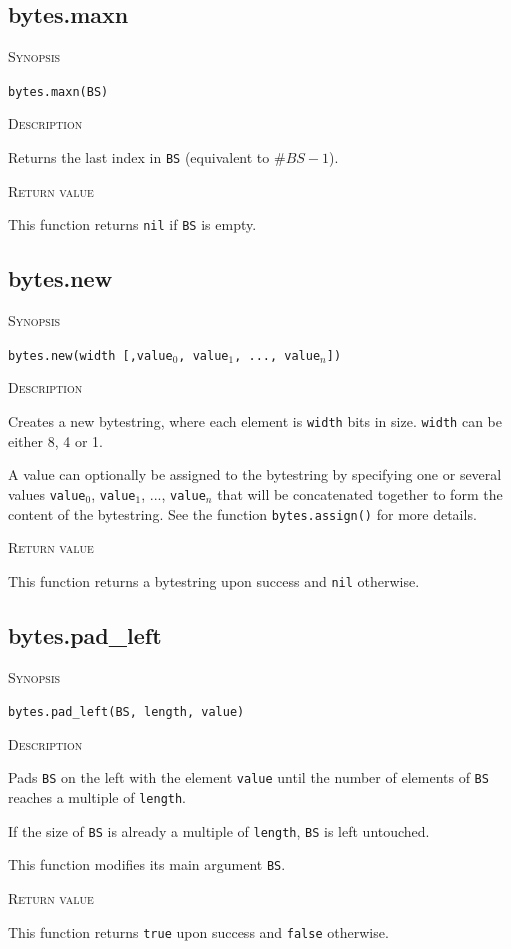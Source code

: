 \documentclass[11pt]{report}
\newcommand{\mansection}[1]{\vspace{0.5em}\par\noindent\textsc{#1}\vspace{0.5em}\par}
\newcommand{\syn}[1]{\texttt{#1}}
\begin{document}
\subsection{bytes.maxn}

\mansection{Synopsis}
\syn{bytes.maxn(BS)}

\mansection{Description}
  Returns the last index in \syn{BS} (equivalent to $\#BS-1$).
\mansection{Return value}
  This function returns \syn{nil} if \syn{BS} is empty.


\subsection{bytes.new}

\mansection{Synopsis}
\syn{bytes.new(width [,\syn{value$_0$}, \syn{value$_1$}, ..., \syn{value$_n$}])}

\mansection{Description}
  Creates a new bytestring, where each element is \syn{width} bits in size.
  \syn{width} can be either 8, 4 or 1.

  A value can optionally be assigned to the bytestring by specifying one or 
  several values \syn{value$_0$}, \syn{value$_1$}, ..., \syn{value$_n$} that will be concatenated
  together to form the content of the bytestring. See the function 
  \syn{bytes.assign()} for more details.
\mansection{Return value}
  This function returns a bytestring upon success and \syn{nil} otherwise. 


\subsection{bytes.pad\_left}

\mansection{Synopsis}
\syn{bytes.pad\_left(BS, length, value)}

\mansection{Description}
  Pads \syn{BS} on the left with the element \syn{value} until the number of elements 
  of \syn{BS} reaches a multiple of \syn{length}.

  If the size of \syn{BS} is already a multiple of \syn{length}, \syn{BS} is left untouched.

  This function modifies its main argument \syn{BS}.
  
\mansection{Return value}
  This function returns \syn{true} upon success and \syn{false} otherwise.


\end{document}
